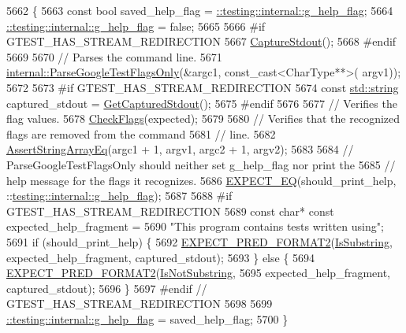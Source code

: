 \begin{DoxyCode}
5662                                                                               \{
5663     \textcolor{keyword}{const} \textcolor{keywordtype}{bool} saved\_help\_flag = \hyperlink{namespacetesting_1_1internal_a93a772f5e51973b105d91cbb66a203f4}{::testing::internal::g\_help\_flag};
5664     \hyperlink{namespacetesting_1_1internal_a93a772f5e51973b105d91cbb66a203f4}{::testing::internal::g\_help\_flag} = \textcolor{keyword}{false};
5665 
5666 \textcolor{preprocessor}{#if GTEST\_HAS\_STREAM\_REDIRECTION}
5667     \hyperlink{namespacetesting_1_1internal_acba06d4f0343dec407738ba5544af990}{CaptureStdout}();
5668 \textcolor{preprocessor}{#endif}
5669 
5670     \textcolor{comment}{// Parses the command line.}
5671     \hyperlink{namespacetesting_1_1internal_a472880afbcc592a41e3d623e2dec8412}{internal::ParseGoogleTestFlagsOnly}(&argc1, const\_cast<CharType**>(
      argv1));
5672 
5673 \textcolor{preprocessor}{#if GTEST\_HAS\_STREAM\_REDIRECTION}
5674     \textcolor{keyword}{const} \hyperlink{namespacetesting_1_1internal_a8e8ff5b11e64078831112677156cb111}{std::string} captured\_stdout = \hyperlink{namespacetesting_1_1internal_aed657219a9856a8d249a3230de0c54ce}{GetCapturedStdout}();
5675 \textcolor{preprocessor}{#endif}
5676 
5677     \textcolor{comment}{// Verifies the flag values.}
5678     \hyperlink{classtesting_1_1InitGoogleTestTest_aac37d5d592202bf6614b02fe0b4da9d2}{CheckFlags}(expected);
5679 
5680     \textcolor{comment}{// Verifies that the recognized flags are removed from the command}
5681     \textcolor{comment}{// line.}
5682     \hyperlink{classtesting_1_1InitGoogleTestTest_af32acd91b1185c6868072009dce55a7b}{AssertStringArrayEq}(argc1 + 1, argv1, argc2 + 1, argv2);
5683 
5684     \textcolor{comment}{// ParseGoogleTestFlagsOnly should neither set g\_help\_flag nor print the}
5685     \textcolor{comment}{// help message for the flags it recognizes.}
5686     \hyperlink{gtest_8h_a4159019abda84f5366acdb7604ff220a}{EXPECT\_EQ}(should\_print\_help, ::\hyperlink{namespacetesting_1_1internal_a93a772f5e51973b105d91cbb66a203f4}{testing::internal::g\_help\_flag});
5687 
5688 \textcolor{preprocessor}{#if GTEST\_HAS\_STREAM\_REDIRECTION}
5689     \textcolor{keyword}{const} \textcolor{keywordtype}{char}* \textcolor{keyword}{const} expected\_help\_fragment =
5690         \textcolor{stringliteral}{"This program contains tests written using"};
5691     \textcolor{keywordflow}{if} (should\_print\_help) \{
5692       \hyperlink{gtest__pred__impl_8h_af0141918615a5e2d5247e9cda8324dae}{EXPECT\_PRED\_FORMAT2}(\hyperlink{namespacetesting_a390c4f66fe7e9098117eb77e5fffa4ad}{IsSubstring}, expected\_help\_fragment, 
      captured\_stdout);
5693     \} \textcolor{keywordflow}{else} \{
5694       \hyperlink{gtest__pred__impl_8h_af0141918615a5e2d5247e9cda8324dae}{EXPECT\_PRED\_FORMAT2}(\hyperlink{namespacetesting_a2288dcf4249f88af67dcd46544dc49a6}{IsNotSubstring},
5695                           expected\_help\_fragment, captured\_stdout);
5696     \}
5697 \textcolor{preprocessor}{#endif  // GTEST\_HAS\_STREAM\_REDIRECTION}
5698 
5699     \hyperlink{namespacetesting_1_1internal_a93a772f5e51973b105d91cbb66a203f4}{::testing::internal::g\_help\_flag} = saved\_help\_flag;
5700   \}
\end{DoxyCode}


